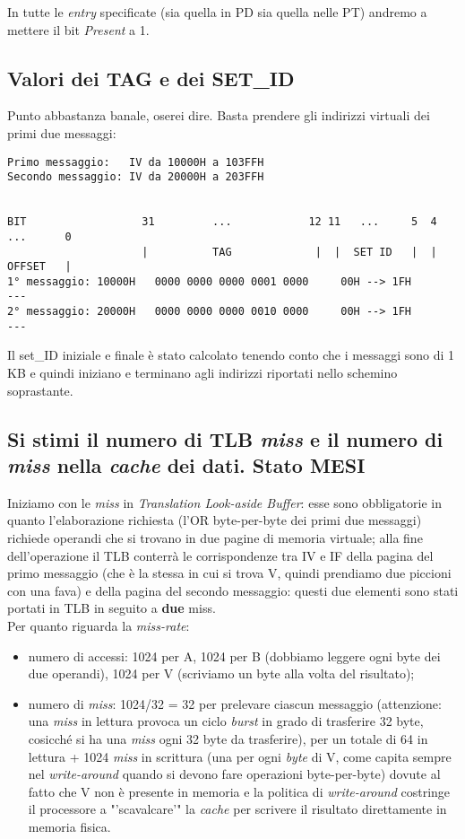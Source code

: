 In tutte le \textit{entry} specificate (sia quella in PD sia quella nelle PT) andremo a mettere il bit \textit{Present} a 1.

\subsection{Valori dei TAG e dei SET\_ID}

Punto abbastanza banale, oserei dire. Basta prendere gli indirizzi virtuali dei primi due messaggi:

\begin{verbatim}
Primo messaggio:   IV da 10000H a 103FFH
Secondo messaggio: IV da 20000H a 203FFH


BIT                  31         ...            12 11   ...     5  4  ...      0
                     |          TAG             |  |  SET ID   |  |  OFFSET   |
1° messaggio: 10000H   0000 0000 0000 0001 0000     00H --> 1FH       ---         
2° messaggio: 20000H   0000 0000 0000 0010 0000     00H --> 1FH       ---
\end{verbatim}
Il set\_ID iniziale e finale è stato calcolato tenendo conto che i messaggi sono di 1 KB e quindi iniziano e terminano agli indirizzi riportati nello schemino soprastante.

\subsection{Si stimi il numero di TLB \textit{miss} e il numero di \textit{miss} nella \textit{cache} dei dati. Stato MESI}

Iniziamo con le \textit{miss} in \textit{Translation Look-aside Buffer}: esse sono obbligatorie in quanto l'elaborazione richiesta (l'OR byte-per-byte dei primi due messaggi) richiede operandi che si trovano in due pagine di memoria virtuale; alla fine dell'operazione il TLB conterrà le corrispondenze tra IV e IF della pagina del primo messaggio (che è la stessa in cui si trova V, quindi prendiamo due piccioni con una fava) e della pagina del secondo messaggio: questi due elementi sono stati portati in TLB in seguito a \textbf{due} miss. \\

Per quanto riguarda la \textit{miss-rate}:
\begin{itemize}
\item numero di accessi: 1024 per A, 1024 per B (dobbiamo leggere ogni byte dei due operandi), 1024 per V (scriviamo un byte alla volta del risultato);
\item numero di \textit{miss}: 1024/32 = 32 per prelevare ciascun messaggio (attenzione: una \textit{miss} in lettura provoca un ciclo \textit{burst} in grado di trasferire 32 byte, cosicché si ha una \textit{miss} ogni 32 byte da trasferire), per un totale di 64 in lettura + 1024 \textit{miss} in scrittura (una per ogni \textit{byte} di V, come capita sempre nel \textit{write-around} quando si devono fare operazioni byte-per-byte) dovute al fatto che V non è presente in memoria e la politica di \textit{write-around} costringe il processore a "'scavalcare'" la \textit{cache} per scrivere il risultato direttamente in memoria fisica.
\end{itemize}

